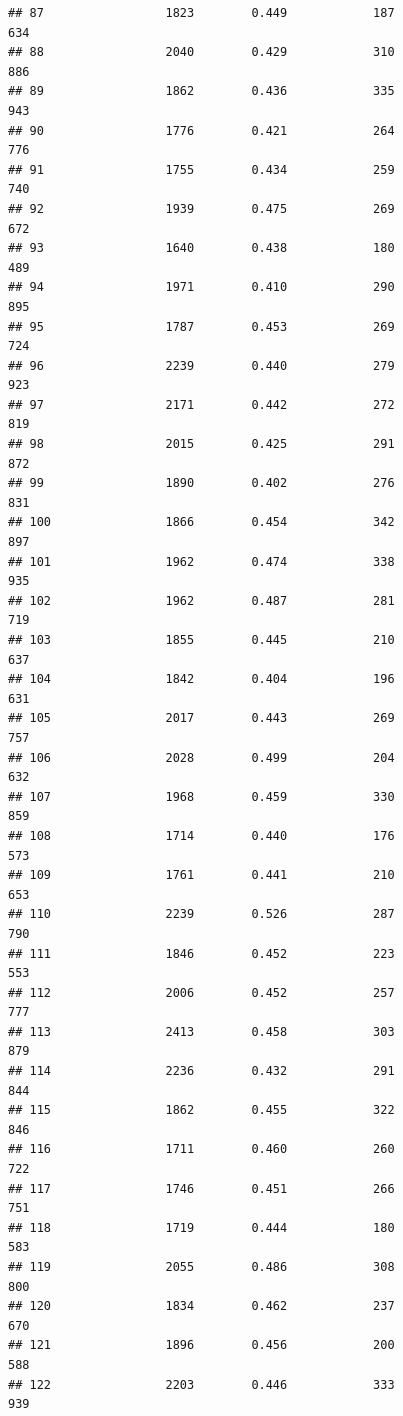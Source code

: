 \documentclass[]{book}
\begin{document}
\begin{verbatim}
## 87                 1823        0.449            187                634
## 88                 2040        0.429            310                886
## 89                 1862        0.436            335                943
## 90                 1776        0.421            264                776
## 91                 1755        0.434            259                740
## 92                 1939        0.475            269                672
## 93                 1640        0.438            180                489
## 94                 1971        0.410            290                895
## 95                 1787        0.453            269                724
## 96                 2239        0.440            279                923
## 97                 2171        0.442            272                819
## 98                 2015        0.425            291                872
## 99                 1890        0.402            276                831
## 100                1866        0.454            342                897
## 101                1962        0.474            338                935
## 102                1962        0.487            281                719
## 103                1855        0.445            210                637
## 104                1842        0.404            196                631
## 105                2017        0.443            269                757
## 106                2028        0.499            204                632
## 107                1968        0.459            330                859
## 108                1714        0.440            176                573
## 109                1761        0.441            210                653
## 110                2239        0.526            287                790
## 111                1846        0.452            223                553
## 112                2006        0.452            257                777
## 113                2413        0.458            303                879
## 114                2236        0.432            291                844
## 115                1862        0.455            322                846
## 116                1711        0.460            260                722
## 117                1746        0.451            266                751
## 118                1719        0.444            180                583
## 119                2055        0.486            308                800
## 120                1834        0.462            237                670
## 121                1896        0.456            200                588
## 122                2203        0.446            333                939

\end{verbatim}
\end{document}
